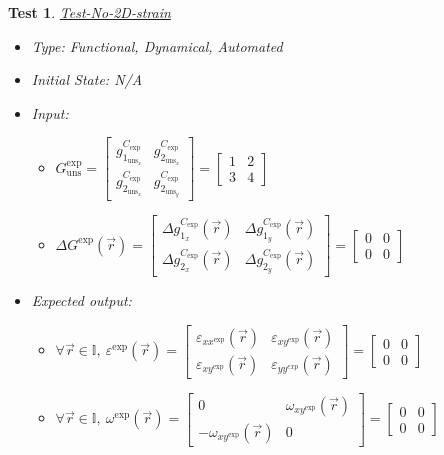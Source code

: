 \documentclass[12pt, titlepage]{article}
\newtheorem{Test}{Test}
\begin{document}
\begin{Test}\normalfont\underline{Test-No-2D-strain}
\label{T_No-2D-strain}
\begin{itemize}
\item Type: Functional, Dynamical, Automated
\item Initial State: N/A
\item Input:
\begin{itemize}
	\item $G_{\text{uns}}^{\text{exp}} =
	\begin{bmatrix}
	g_{1_{{\text{uns}}_x}}^{C_{\text{exp}}} & g_{2_{{\text{uns}}_x}}^{C_{\text{exp}}} \\
	g_{2_{{\text{uns}}_x}}^{C_{\text{exp}}} & g_{2_{{\text{uns}}_y}}^{C_{\text{exp}}} 
	\end{bmatrix} =\begin{bmatrix}
	1 & 2 \\
	3 & 4 
	\end{bmatrix} $
	\item $\Delta G^{\text{exp}}(\vec{r})=
	\begin{bmatrix}
	\Delta g_{1_{x}}^{C_{\text{exp}}}(\vec{r}) & \Delta g_{1_{y}}^{C_{\text{exp}}}(\vec{r}) \\
	\Delta g_{2_{x}}^{C_{\text{exp}}}(\vec{r}) & \Delta g_{2_{y}}^{C_{\text{exp}}}(\vec{r})
	\end{bmatrix} = \begin{bmatrix}
	0 & 0 \\
	0 & 0 
	\end{bmatrix} $
	\end{itemize} 
\item Expected output:
	\begin{itemize}
	\item  $\forall \vec{r} \in \mathbb{I}, \ \varepsilon^{\text{exp}}(\vec{r}) = \begin{bmatrix}
	\varepsilon_{\mathit{xx}^{\text{exp}}}(\vec{r}) & \varepsilon_{\mathit{xy}^{\text{exp}}}(\vec{r}) \\
	\varepsilon_{\mathit{xy}^{\text{exp}}}(\vec{r}) & \varepsilon_{\mathit{yy^{\text{exp}}}}(\vec{r})
	\end{bmatrix} = \begin{bmatrix}
	0 & 0 \\
	0 & 0 
	\end{bmatrix} $
	\item $\forall \vec{r} \in \mathbb{I}, \  \omega^{\text{exp}}(\vec{r}) = \begin{bmatrix}
	0 & \omega_{\mathit{xy}^{\text{exp}}}(\vec{r}) \\
	-\omega_{\mathit{xy}^{\text{exp}}}(\vec{r}) & 0 
	\end{bmatrix} = \begin{bmatrix}
	0 & 0 \\
	0 & 0 
	\end{bmatrix} $
	\end{itemize}
\end{itemize}
\end{Test}
\end{document}
